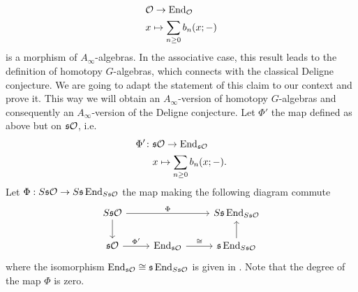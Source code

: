 \documentclass[Thesis.tex]{subfiles}
\begin{document}
\begin{align*}
&{\mathcal O} \to \operatorname{End}_{\mathcal O}\\
&x\mapsto \sum_{n\geq 0}b_n(x;-)
\end{align*}
is a morphism of $A_\infty$-algebras. In the associative case, this result leads to the definition of homotopy $G$-algebras, which connects with the classical Deligne conjecture. We are going to adapt the statement of this claim to our context and prove it. This way we will obtain an $A_\infty$-version of homotopy $G$-algebras and consequently an $A_\infty$-version of the Deligne conjecture. Let $\Phi'$ the map defined as above but on $\mathfrak{s}{\mathcal O}$, i.e.
\begin{align*}
\Phi'\colon&\mathfrak{s}{\mathcal O} \to \operatorname{End}_{\mathfrak{s}{\mathcal O}}\\
&x\mapsto \sum_{n\geq 0}b_n(x;-).
\end{align*}
Let $\Phi:S\mathfrak{s}{\mathcal O}\to S\mathfrak{s}\operatorname{End}_{S\mathfrak{s}{\mathcal O}}$ the map making the following diagram commute
\begin{equation}\label{Phi}
\begin{tikzcd}
S\s\OO\arrow[rr, "\Phi"]\arrow[d] & & S\s\End_{S\s\OO}\\
\s\OO\arrow[r, "\Phi'"]& \End_{\s\OO}\arrow[r, "\cong"]& \s\End_{S\s\OO}\arrow[u]
\end{tikzcd}
\end{equation}
where the isomorphism $\operatorname{End}_{\mathfrak{s}{\mathcal O}}\cong\mathfrak{s}\operatorname{End}_{S\mathfrak{s}{\mathcal O}}$ is given in . Note that the degree of the map $\Phi$ is zero.
\end{document}
